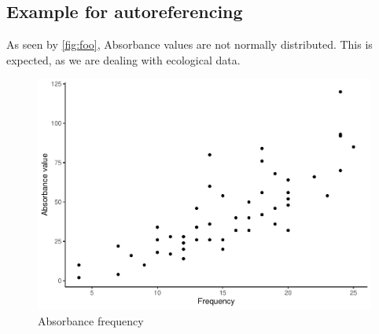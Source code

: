 \documentclass[12pt,]{article}
\begin{document}
\hypertarget{example-for-autoreferencing}{%
\subsection{Example for
autoreferencing}\label{example-for-autoreferencing}}

As seen by \autoref{fig:foo}, Absorbance values are not normally
distributed. This is expected, as we are dealing with ecological data.

\begin{figure}
\centering
\includegraphics{Project_Template_files/figure-latex/foo-1.pdf}
\caption{\label{fig:foo}Absorbance frequency}
\end{figure}
\end{document}
